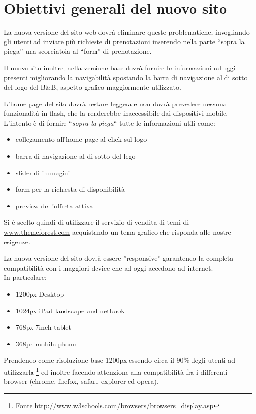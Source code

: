 \documentclass[a4paper,12pt,hidelinks]{report}
\begin{document}
\section{Obiettivi generali del nuovo sito}
  La nuova versione del sito web dovrà eliminare queste problematiche, invogliando gli utenti ad inviare più richieste di prenotazioni
  inserendo nella parte ``sopra la piega'' una scorciatoia al ``form'' di prenotazione.
  \par Il nuovo sito inoltre, nella versione base dovrà fornire le informazioni ad oggi presenti migliorando la navigabilità spostando la barra di navigazione 
  al di sotto del logo del B\&B, aspetto grafico maggiormente utilizzato.
  \par L'home page del sito dovrà restare leggera e non dovrà prevedere nessuna funzionalità in flash, che la renderebbe inaccessibile dai dispositivi mobile.
  L'intento è di fornire ``\textit{sopra la piega}`` tutte le informazioni utili come:
  \begin{itemize}
    \item collegamento all'home page al click sul logo
    \item barra di navigazione al di sotto del logo
    \item slider di immagini
    \item form per la richiesta di disponibilità
    \item preview dell'offerta attiva
  \end{itemize}
  Si è scelto quindi di utilizzare il servizio di vendita di temi di \url{www.themeforest.com} acquistando un tema grafico che risponda alle nostre esigenze.
  \par La nuova versione del sito dovrà essere ''responsive'' garantendo la completa compatibilità con i maggiori device che ad oggi accedono ad internet.
  \\In particolare:
  \begin{itemize}
    \item 1200px Desktop
    \item 1024px iPad landscape and netbook
    \item 768px 7inch tablet
    \item 368px mobile phone
  \end{itemize}
  Prendendo come risoluzione base 1200px essendo circa il 90\% degli utenti ad utilizzarla \footnote{Fonte \url{http://www.w3schools.com/browsers/browsers_display.asp}}
  ed inoltre facendo attenzione alla compatibilità fra i differenti browser (chrome, firefox, safari, explorer ed opera).
\end{document}
